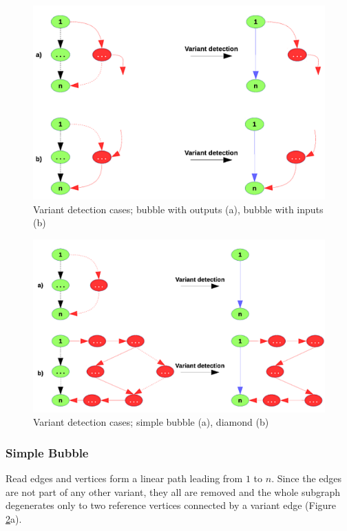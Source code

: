 \begin{figure}[h]
	\centering
	\includegraphics{img/variant-detection-ab.pdf}
	\caption{Variant detection cases; bubble with outputs (a), bubble with inputs (b)}
	\label{fig:variant-detection-ab}
\end{figure}

\begin{figure}[h]
	\centering
	\includegraphics{img/variant-detection-cd.pdf}
	\caption{Variant detection cases; simple bubble (a), diamond (b)}
	\label{fig:variant-detection-cd}
\end{figure}

\subsubsection{Simple Bubble}
\label{subsec:simple-bubble}

Read edges and vertices form a linear path leading from $1$ to $n$. Since the edges are not part of any other variant, they all are removed and the whole subgraph degenerates only to two reference vertices connected by a variant edge (Figure \ref{fig:variant-detection-cd}a).

